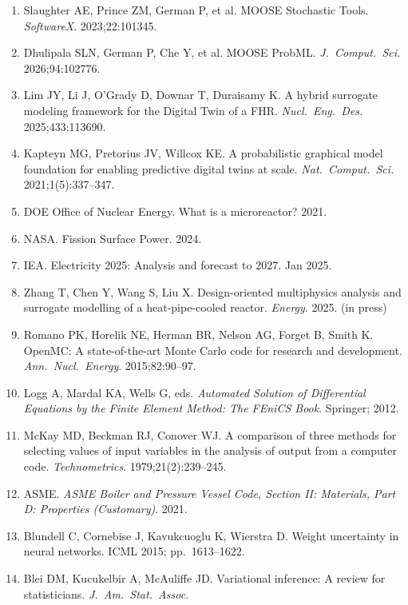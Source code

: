 \documentclass[11pt,a4paper]{article}
\begin{document}
\begin{enumerate}
\item Slaughter AE, Prince ZM, German P, et al. MOOSE Stochastic Tools.
      \textit{SoftwareX}. 2023;22:101345.
\item Dhulipala SLN, German P, Che Y, et al. MOOSE ProbML.
      \textit{J.\ Comput.\ Sci.} 2026;94:102776.
\item Lim JY, Li J, O'Grady D, Downar T, Duraisamy K. A hybrid
      surrogate modeling framework for the Digital Twin of a FHR.
      \textit{Nucl.\ Eng.\ Des.} 2025;433:113690.
\item Kapteyn MG, Pretorius JV, Willcox KE. A probabilistic graphical
      model foundation for enabling predictive digital twins at scale.
      \textit{Nat.\ Comput.\ Sci.} 2021;1(5):337--347.
\item DOE Office of Nuclear Energy. What is a microreactor? 2021.
\item NASA. Fission Surface Power. 2024.
\item IEA. Electricity 2025: Analysis and forecast to 2027. Jan 2025.
\item Zhang T, Chen Y, Wang S, Liu X. Design-oriented multiphysics
      analysis and surrogate modelling of a heat-pipe-cooled reactor.
      \textit{Energy}. 2025. (in press)
\item Romano PK, Horelik NE, Herman BR, Nelson AG, Forget B, Smith K.
      OpenMC: A state-of-the-art Monte Carlo code for research and
      development. \textit{Ann.\ Nucl.\ Energy}. 2015;82:90--97.
\item Logg A, Mardal KA, Wells G, eds. \textit{Automated Solution of
      Differential Equations by the Finite Element Method: The FEniCS
      Book}. Springer; 2012.
\item McKay MD, Beckman RJ, Conover WJ. A comparison of three methods
      for selecting values of input variables in the analysis of output
      from a computer code. \textit{Technometrics}. 1979;21(2):239--245.
\item ASME. \textit{ASME Boiler and Pressure Vessel Code, Section II:
      Materials, Part D: Properties (Customary)}. 2021.
\item Blundell C, Cornebise J, Kavukcuoglu K, Wierstra D. Weight
      uncertainty in neural networks. ICML 2015; pp.\ 1613--1622.
\item Blei DM, Kucukelbir A, McAuliffe JD. Variational inference: A
      review for statisticians. \textit{J.\ Am.\ Stat.\ Assoc.}

\end{enumerate}
\end{document}
